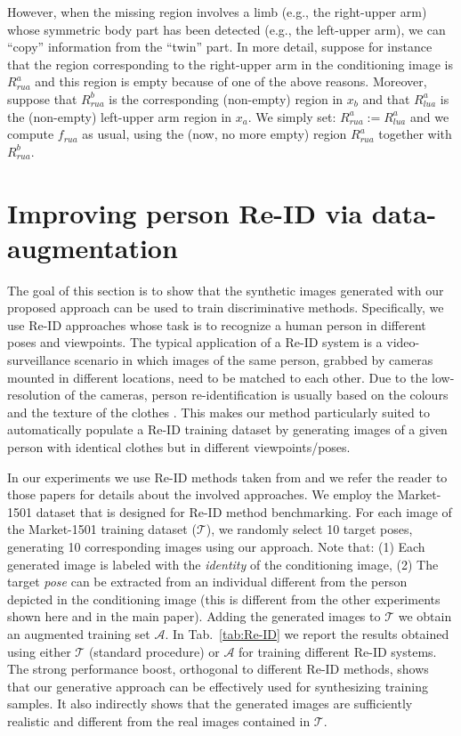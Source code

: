 \documentclass[10pt,twocolumn,letterpaper]{article}
\begin{document}
However, when the missing region involves a limb (e.g., the right-upper arm) whose symmetric body part has been detected (e.g., the left-upper arm), we can ``copy'' information from the ``twin'' part.
In more detail, suppose for instance that the region corresponding to the right-upper arm in the conditioning image is $R_{rua}^a$ and this region is empty because of one of the above reasons. Moreover, suppose that $R_{rua}^b$ is the corresponding (non-empty) region in $x_b$ and that $R_{lua}^a$
is the (non-empty)  left-upper arm region in $x_a$. We simply set: $R_{rua}^a := R_{lua}^a$ and we compute $f_{rua}$ as usual, using the (now, no more empty) region $R_{rua}^a$ together with  $R_{rua}^b$.


\section{Improving person Re-ID via data-augmentation}
\label{PersonRe-ID}


The goal of this section is to show that the synthetic images generated with our proposed approach can be used to train discriminative methods. Specifically, we use Re-ID approaches whose task is to recognize a human person in different poses and viewpoints. The typical application  of a Re-ID system is a video-surveillance  scenario  in which
 images of the same person, grabbed by 
cameras mounted in different  locations, need to be matched to  each other. Due to the low-resolution of the cameras, person re-identification is usually based on the colours and the texture of the clothes  \cite{DBLP:journals/corr/ZhengYH16}. This makes our method particularly suited to automatically populate a Re-ID training dataset by generating images of a given person with identical clothes but in different viewpoints/poses. 

In our   experiments we use   
Re-ID methods taken from \cite{DBLP:journals/corr/ZhengYH16,DBLP:journals/tomccap/ZhengZY18} and we refer the reader to those papers for details about the involved approaches.
We employ the Market-1501 dataset that is designed for Re-ID method benchmarking.
For each image of the Market-1501 training dataset ($\mathcal{T}$), we randomly select 10 target poses, generating 10 corresponding images using our approach.
Note that: (1) Each generated image is labeled with the {\em identity} of the conditioning image, (2) 
The target {\em pose} can be extracted from an individual different from the person depicted in the conditioning image
(this is different from the other experiments shown here and in the main paper).
Adding the generated images to $\mathcal{T}$ we obtain an augmented training set $\mathcal{A}$. 
In Tab.~\ref{tab:Re-ID} 
we report the results obtained using either $\mathcal{T}$ (standard procedure) or $\mathcal{A}$
for training different Re-ID systems.
 The strong performance boost, orthogonal to different Re-ID methods,
shows that our generative approach can be effectively used 
 for synthesizing training samples.
It also indirectly shows that the generated images are sufficiently realistic and different from the real images contained in $\mathcal{T}$.
\end{document}
